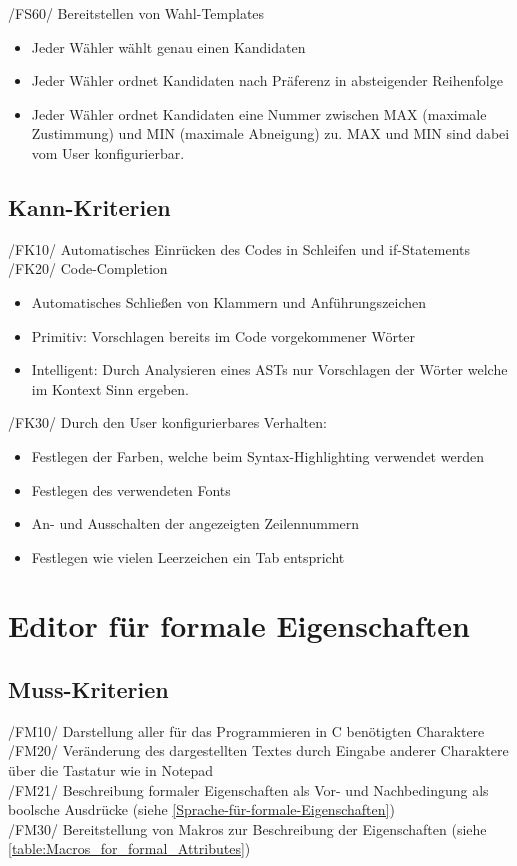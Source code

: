 \documentclass[a4paper]{scrreprt}
\begin{document}
/FS60/ Bereitstellen von Wahl-Templates
\begin{itemize}
\item Jeder Wähler wählt genau einen Kandidaten
\item Jeder Wähler ordnet Kandidaten nach Präferenz in absteigender Reihenfolge 
\item Jeder Wähler ordnet Kandidaten eine Nummer zwischen MAX (maximale Zustimmung) und MIN (maximale Abneigung) zu. MAX und MIN sind dabei vom User konfigurierbar. 
\end{itemize}

\subsection{Kann-Kriterien}
/FK10/ Automatisches Einrücken des Codes in Schleifen und if-Statements \\
/FK20/ Code-Completion
\begin{itemize}
\item Automatisches Schließen von Klammern und Anführungszeichen
\item Primitiv: Vorschlagen bereits im Code vorgekommener Wörter
\item Intelligent: Durch Analysieren eines ASTs nur Vorschlagen der Wörter welche im Kontext Sinn ergeben.
\end{itemize}

/FK30/ Durch den User konfigurierbares Verhalten:
\begin{itemize}
\item Festlegen der Farben, welche beim Syntax-Highlighting verwendet werden
\item Festlegen des verwendeten Fonts
\item An- und Ausschalten der angezeigten Zeilennummern
\item Festlegen wie vielen Leerzeichen ein Tab entspricht
\end{itemize}
 
\section{Editor für formale Eigenschaften}
\subsection{Muss-Kriterien}
/FM10/ Darstellung aller für das Programmieren in C benötigten Charaktere \\
/FM20/ Veränderung des dargestellten Textes durch Eingabe anderer Charaktere über die  Tastatur wie in Notepad \\
/FM21/ Beschreibung formaler Eigenschaften als Vor- und Nachbedingung als boolsche Ausdrücke (siehe \ref{Sprache-für-formale-Eigenschaften})\\
/FM30/ Bereitstellung von Makros zur Beschreibung der Eigenschaften (siehe \ref{table:Macros_for_formal_Attributes}) \\
\end{document}
